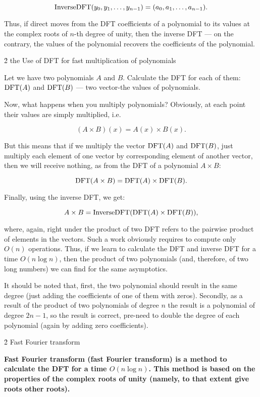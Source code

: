 $$ {\rm InverseDFT}(y_0, y_1, \ldots, y_{n-1}) = (a_0, a_1, \ldots, a_{n-1}). $$

Thus, if direct moves from the DFT coefficients of a polynomial to its values at the complex roots of $n$-th degree of unity, then the inverse DFT --- on the contrary, the values of the polynomial recovers the coefficients of the polynomial.


\h2{ the Use of DFT for fast multiplication of polynomials }

Let we have two polynomials $A$ and $B$. Calculate the DFT for each of them: ${\rm DFT}(A)$ and ${\rm DFT}(B)$ --- two vector-the values of polynomials.

Now, what happens when you multiply polynomials? Obviously, at each point their values are simply multiplied, i.e.

$$ (A \times B)(x) = A(x) \times B(x). $$

But this means that if we multiply the vector ${\rm DFT}(A)$ and ${\rm DFT}(B)$, just multiply each element of one vector by corresponding element of another vector, then we will receive nothing, as from the DFT of a polynomial $A \times B$:

$$ {\rm DFT} (A \times B) = {\rm DFT} (A) \times {\rm DFT} (B). $$

Finally, using the inverse DFT, we get:

$$ A \times B = {\rm InverseDFT}( {\rm DFT} (A) \times {\rm DFT} (B) ), $$

where, again, right under the product of two DFT refers to the pairwise product of elements in the vectors. Such a work obviously requires to compute only $O(n)$ operations. Thus, if we learn to calculate the DFT and inverse DFT for a time $O(n \log n)$, then the product of two polynomials (and, therefore, of two long numbers) we can find for the same asymptotics.

It should be noted that, first, the two polynomial should result in the same degree (just adding the coefficients of one of them with zeros). Secondly, as a result of the product of two polynomials of degree $n$ the result is a polynomial of degree $2n-1$, so the result is correct, pre-need to double the degree of each polynomial (again by adding zero coefficients).


\h2{ Fast Fourier transform }

\bf{Fast Fourier transform} (fast Fourier transform) is a method to calculate the DFT for a time $O(n \log n)$. This method is based on the properties of the complex roots of unity (namely, to that extent give roots other roots).

